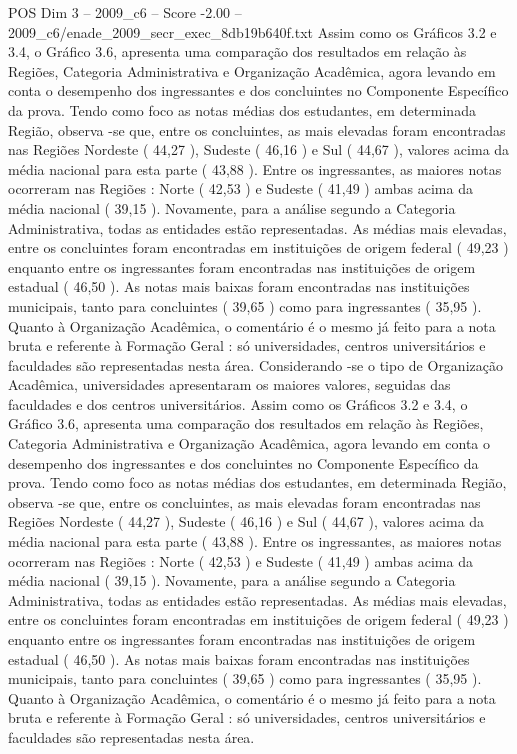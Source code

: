 \begin{textsample}{POS Dim 3 – 2009\_c6 – Score -2.00 – 2009\_c6/enade\_2009\_secr\_exec\_8db19b640f.txt}
Assim como os Gráficos 3.2 e 3.4, o Gráfico 3.6, apresenta uma comparação dos resultados em relação às Regiões, Categoria Administrativa e Organização Acadêmica, agora levando em conta o desempenho dos ingressantes e dos concluintes no Componente Específico da prova.
Tendo como foco as notas médias dos estudantes, em determinada Região, observa -se que, entre os concluintes, as mais elevadas foram encontradas nas Regiões Nordeste ( 44,27 ), Sudeste ( 46,16 ) e Sul ( 44,67 ), valores acima da média nacional para esta parte ( 43,88 ).
Entre os ingressantes, as maiores notas ocorreram nas Regiões : Norte ( 42,53 ) e Sudeste ( 41,49 ) ambas acima da média nacional ( 39,15 ).
Novamente, para a análise segundo a Categoria Administrativa, todas as entidades estão representadas.
As médias mais elevadas, entre os concluintes foram encontradas em instituições de origem federal ( 49,23 ) enquanto entre os ingressantes foram encontradas nas instituições de origem estadual ( 46,50 ).
As notas mais baixas foram encontradas nas instituições municipais, tanto para concluintes ( 39,65 ) como para ingressantes ( 35,95 ).
Quanto à Organização Acadêmica, o comentário é o mesmo já feito para a nota bruta e referente à Formação Geral : só universidades, centros universitários e faculdades são representadas nesta área.
Considerando -se o tipo de Organização Acadêmica, universidades apresentaram os maiores valores, seguidas das faculdades e dos centros universitários.
Assim como os Gráficos 3.2 e 3.4, o Gráfico 3.6, apresenta uma comparação dos resultados em relação às Regiões, Categoria Administrativa e Organização Acadêmica, agora levando em conta o desempenho dos ingressantes e dos concluintes no Componente Específico da prova.
Tendo como foco as notas médias dos estudantes, em determinada Região, observa -se que, entre os concluintes, as mais elevadas foram encontradas nas Regiões Nordeste ( 44,27 ), Sudeste ( 46,16 ) e Sul ( 44,67 ), valores acima da média nacional para esta parte ( 43,88 ).
Entre os ingressantes, as maiores notas ocorreram nas Regiões : Norte ( 42,53 ) e Sudeste ( 41,49 ) ambas acima da média nacional ( 39,15 ).
Novamente, para a análise segundo a Categoria Administrativa, todas as entidades estão representadas.
As médias mais elevadas, entre os concluintes foram encontradas em instituições de origem federal ( 49,23 ) enquanto entre os ingressantes foram encontradas nas instituições de origem estadual ( 46,50 ).
As notas mais baixas foram encontradas nas instituições municipais, tanto para concluintes ( 39,65 ) como para ingressantes ( 35,95 ).
Quanto à Organização Acadêmica, o comentário é o mesmo já feito para a nota bruta e referente à Formação Geral : só universidades, centros universitários e faculdades são representadas nesta área.

\end{textsample}
